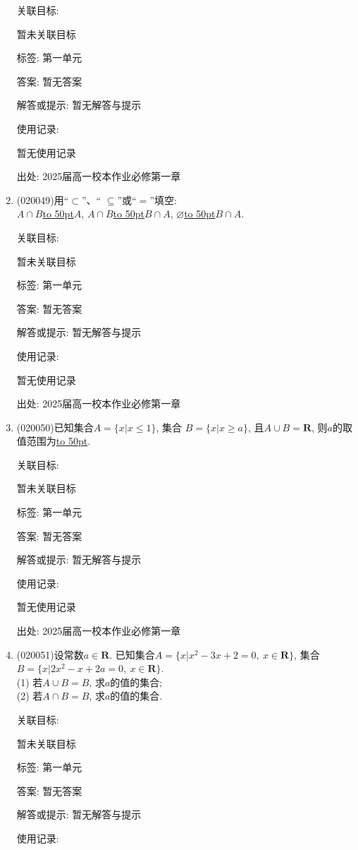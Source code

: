 \documentclass[10pt,a4paper]{article}
\newcommand{\blank}[1]{\underline{\hbox to #1pt{}}}
\begin{document}
\begin{enumerate}[1.]
关联目标:

暂未关联目标



标签: 第一单元

答案: 暂无答案

解答或提示: 暂无解答与提示

使用记录:

暂无使用记录


出处: 2025届高一校本作业必修第一章
\item { (020049)}用``$\subset$''、`` $\subseteq$''或``$=$''填空:\\
$A\cap B$\blank{50}$A$, $A\cap B$\blank{50}$B\cap A$, $\varnothing$\blank{50}$B\cap A$.


关联目标:

暂未关联目标



标签: 第一单元

答案: 暂无答案

解答或提示: 暂无解答与提示

使用记录:

暂无使用记录


出处: 2025届高一校本作业必修第一章
\item { (020050)}已知集合$A=\{x| x\le 1\}$, 集合 $B=\{x| x\ge a\}$, 且$A\cup B=\mathbf{R}$, 则$a$的取值范围为\blank{50}.


关联目标:

暂未关联目标



标签: 第一单元

答案: 暂无答案

解答或提示: 暂无解答与提示

使用记录:

暂无使用记录


出处: 2025届高一校本作业必修第一章
\item { (020051)}设常数$a\in \mathbf{R}$. 已知集合$A=\{x|x^2-3x+2=0, \ x\in\mathbf{R}\}$, 集合$B=\{x|2x^2-x+2a=0,\  x\in\mathbf{R}\}$.\\ (1) 若$A\cup B=B$, 求$a$的值的集合;\\
(2) 若$A\cap B=B$, 求$a$的值的集合.


关联目标:

暂未关联目标



标签: 第一单元

答案: 暂无答案

解答或提示: 暂无解答与提示

使用记录:


\end{enumerate}
\end{document}
